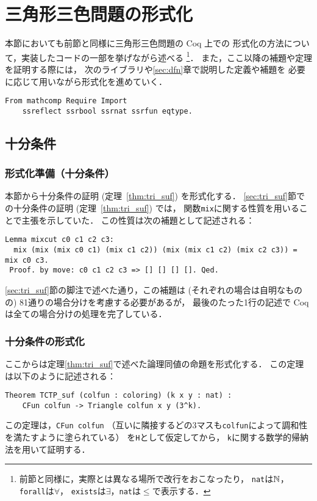 \section{三角形三色問題の形式化}
本節においても前節と同様に三角形三色問題の Coq 上での
形式化の方法について，実装したコードの一部を挙げながら述べる
\footnote
    {
      前節と同様に，実際とは異なる場所で改行をおこなったり，
      {\tt{nat}}は$\mathbb{N}$，{\tt{forall}}は$\forall$，
      {\tt{exists}}は$\exists$，{\tt{nat}}は$\leq$で表示する．
    }．
また，ここ以降の補題や定理を証明する際には，
次のライブラリや\ref{sec:dfn}章で説明した定義や補題を
必要に応じて用いながら形式化を進めていく．
\begin{lstlisting}[language=Coq]
  From mathcomp Require Import
    ssreflect ssrbool ssrnat ssrfun eqtype.
\end{lstlisting}
  
\subsection{十分条件} \label{sec_suf_coq}
\subsubsection{形式化準備（十分条件）}
本節から十分条件の証明 (定理~\ref{thm:tri_suf}) を形式化する．
\ref{sec:tri_suf}節での十分条件の証明 (定理~\ref{thm:tri_suf}) では，
関数{\tt mix}に関する性質を用いることで主張を示していた．
この性質は次の補題として記述される：
\begin{lstlisting}[language=Coq]
 Lemma mixcut c0 c1 c2 c3:
  mix (mix (mix c0 c1) (mix c1 c2)) (mix (mix c1 c2) (mix c2 c3)) = mix c0 c3.
 Proof. by move: c0 c1 c2 c3 => [] [] [] []. Qed.
\end{lstlisting}
\ref{sec:tri_suf}節の脚注で述べた通り，この補題は (それぞれの場合は自明なものの) 81通りの場合分けを考慮する必要があるが，
最後のたった1行の記述で Coq は全ての場合分けの処理を完了している．

\subsubsection{十分条件の形式化}
ここからは定理\ref{thm:tri_suf}で述べた論理同値の命題を形式化する．
この定理は以下のように記述される：
\begin{lstlisting}[language=Coq]
  Theorem TCTP_suf (colfun : coloring) (k x y : nat) :
    CFun colfun -> Triangle colfun x y (3^k).
\end{lstlisting}
この定理は，{\tt{CFun colfun}}
（互いに隣接するどの3マスも{\tt{colfun}}によって調和性を満たすように塗られている）
を{\tt{H}}として仮定してから，
{\tt{k}}に関する数学的帰納法を用いて証明する．

